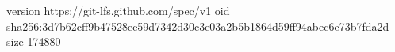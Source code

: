 version https://git-lfs.github.com/spec/v1
oid sha256:3d7b62cff9b47528ee59d7342d30c3e03a2b5b1864d59ff94abec6e73b7fda2d
size 174880
